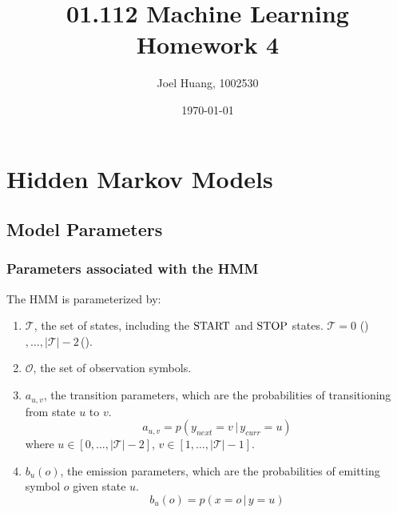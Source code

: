 \documentclass[9pt,twocolumn]{article}
\title{
    01.112 Machine Learning\\
    Homework 4
}
\author{Joel Huang, 1002530}
\date{\today}
\newcommand{\START}{\text{\lstinline{START}}}
\newcommand{\STOP}{\text{\lstinline{STOP}}}
\begin{document}
\maketitle

\section*{Hidden Markov Models}
    \subsection*{Model Parameters}
        \subsubsection*{Parameters associated with the HMM}
            The HMM is parameterized by:
            \begin{enumerate}
            \item
                $\mathcal{T}$, the set of states, including the $\START$ and $\STOP$ states. $\mathcal{T} = 0$ (\START)$, \ldots, |\mathcal{T}|-2\,$(\STOP).
            \item
                $\mathcal{O}$, the set of observation symbols.
            \item
                $a_{u,v}$, the transition parameters, which are the probabilities of transitioning from state $u$ to $v$.
                \begin{equation}
                    a_{u,v} = p(y_{next} = v\,|\,y_{curr} = u)  
                \end{equation}
                where $u \in [0, \ldots, |\mathcal{T}|-2]$, $v \in [1, \ldots, |\mathcal{T}|-1]$.
            \item
                $b_{u}(o)$, the emission parameters, which are the probabilities of emitting symbol $o$ given state $u$.
                \begin{equation}
                    b_u(o) = p(x=o\,|\,y=u)
                 \end{equation}
            \end{enumerate}
\end{document}
